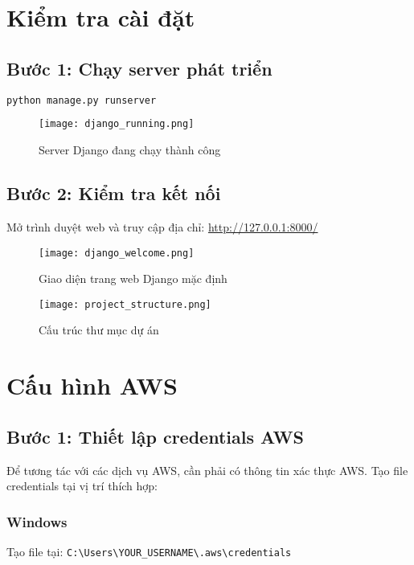 \documentclass[12pt,a4paper]{article}
\begin{document}
\section{Kiểm tra cài đặt}

\subsection{Bước 1: Chạy server phát triển}

\begin{lstlisting}[language=bash]
python manage.py runserver
\end{lstlisting}

\begin{figure}[h]
    \centering
    \texttt{[image: django\_running.png]}
    \caption{Server Django đang chạy thành công}
    \label{fig:django-running}
\end{figure}

\subsection{Bước 2: Kiểm tra kết nối}

Mở trình duyệt web và truy cập địa chỉ: \url{http://127.0.0.1:8000/}

\begin{figure}[h]
    \centering
    \texttt{[image: django\_welcome.png]}
    \caption{Giao diện trang web Django mặc định}
    \label{fig:django-welcome}
\end{figure}

\begin{figure}[h]
    \centering
    \texttt{[image: project\_structure.png]}
    \caption{Cấu trúc thư mục dự án}
    \label{fig:project-structure}
\end{figure}

\section{Cấu hình AWS}

\subsection{Bước 1: Thiết lập credentials AWS}

Để tương tác với các dịch vụ AWS, cần phải có thông tin xác thực AWS. Tạo file credentials tại vị trí thích hợp:

\subsubsection{Windows}
Tạo file tại: \texttt{C:\textbackslash Users\textbackslash YOUR\_USERNAME\textbackslash .aws\textbackslash credentials}
\end{document}
